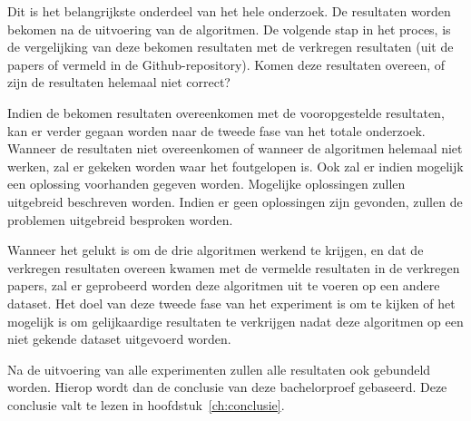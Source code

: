 Dit is het belangrijkste onderdeel van het hele onderzoek. De resultaten worden bekomen na de uitvoering van de algoritmen. De volgende stap in het proces, is de vergelijking van deze bekomen resultaten met de verkregen resultaten (uit de papers of vermeld in de Github-repository). Komen deze resultaten overeen, of zijn de resultaten helemaal niet correct? 

Indien de bekomen resultaten overeenkomen met de vooropgestelde resultaten, kan er verder gegaan worden naar de tweede fase van het totale onderzoek. Wanneer de resultaten niet overeenkomen of wanneer de algoritmen helemaal niet werken, zal er gekeken worden waar het foutgelopen is. Ook zal er indien mogelijk een oplossing voorhanden gegeven worden. Mogelijke oplossingen zullen uitgebreid beschreven worden. Indien er geen oplossingen zijn gevonden, zullen de problemen uitgebreid besproken worden.

Wanneer het gelukt is om de drie algoritmen werkend te krijgen, en dat de verkregen resultaten overeen kwamen met de vermelde resultaten in de verkregen papers, zal er geprobeerd worden deze algoritmen uit te voeren op een andere dataset. Het doel van deze tweede fase van het experiment is om te kijken of het mogelijk is om gelijkaardige resultaten te verkrijgen nadat deze algoritmen op een niet gekende dataset uitgevoerd worden.

Na de uitvoering van alle experimenten zullen alle resultaten ook gebundeld worden. Hierop wordt dan de conclusie van deze bachelorproef gebaseerd. Deze conclusie valt te lezen in hoofdstuk~\ref{ch:conclusie}.